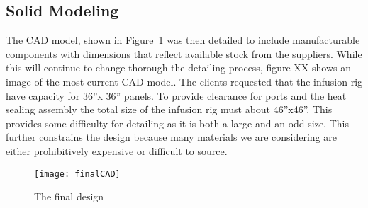 \documentclass[12pt,letterpaper,notitlepage]{article}
\begin{document}
\subsection{Solid Modeling}
The CAD model, shown in Figure~\ref{fig:finalCAD} was then detailed to include manufacturable components with dimensions that reflect available stock from the suppliers. While this will continue to change thorough the detailing process, figure XX shows an image of the most current CAD model. The clients requested that the infusion rig have capacity for 36”x 36” panels. To provide clearance for ports and the heat sealing assembly the total size of the infusion rig must about 46”x46”. This provides some difficulty for detailing as it is both a large and an odd size. This further constrains the design because many materials we are considering are either prohibitively expensive or difficult to source.
\begin{figure}[H]
\centering
\texttt{[image: finalCAD]}
\caption{The final design}
\label{fig:finalCAD}
\end{figure}
\end{document}

